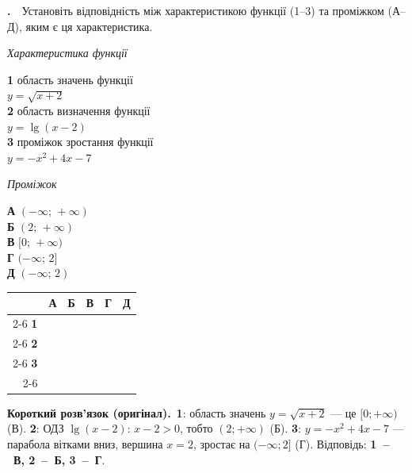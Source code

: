 \documentclass[12pt]{article}
\newcommand{\matchingGrid}{%
    \begingroup
    \renewcommand{\arraystretch}{1.15}
    \setlength{\tabcolsep}{4pt}
    \footnotesize
    \begin{tabular}{r|c|c|c|c|c|}
         \multicolumn{1}{c}{} & \multicolumn{1}{c}{\textbf{А}} & \multicolumn{1}{c}{\textbf{Б}} & \multicolumn{1}{c}{\textbf{В}} & \multicolumn{1}{c}{\textbf{Г}} & \multicolumn{1}{c}{\textbf{Д}} \\ \cline{2-6}
         \textbf{1} & \phantom{X} & \phantom{X} & \phantom{X} & \phantom{X} & \phantom{X} \\ \cline{2-6}
         \textbf{2} & & & & & \\ \cline{2-6}
         \textbf{3} & & & & & \\ \cline{2-6}
    \end{tabular}
    \endgroup
}
\newcounter{zad}
\newcommand{\zadtask}[1]{\stepcounter{zad}\noindent\textbf{\thezad.}\ \ #1\par\vspace{0.2cm}}
\newcommand{\solution}[1]{%
\par\vspace{0.12cm}
\begin{tcolorbox}[colback=titleBg!45, colframe=mainGreen!55, boxrule=0.4pt, arc=2pt,
    left=6pt, right=6pt, top=3pt, bottom=3pt, breakable]
\footnotesize\textbf{Короткий розв'язок (оригінал).}\ #1
\end{tcolorbox}
\par\vspace{0.12cm}
}
\begin{document}
\zadtask{Установіть відповідність між характеристикою функції (1--3) та проміжком (А--Д), яким є ця характеристика.

\vspace{0.2cm}
\noindent
\begin{minipage}[t]{0.45\textwidth}
\textit{Характеристика функції}\par\vspace{0.15cm}
\textbf{1} \quad область значень функції\\ $y = \sqrt{x+2}$\\[0.25cm]
\textbf{2} \quad область визначення функції \\$y = \lg(x-2)$\\[0.25cm]
\textbf{3} \quad проміжок зростання функції\\ $y = -x^2 + 4x - 7$
\end{minipage}
\hfill
\begin{minipage}[t]{0.3\textwidth}
\textit{Проміжок}\par\vspace{0.15cm}
\textbf{А} \quad $(-\infty;\, +\infty)$\\[0.15cm]
\textbf{Б} \quad $(2;\, +\infty)$\\[0.15cm]
\textbf{В} \quad $[0;\, +\infty)$\\[0.15cm]
\textbf{Г} \quad $(-\infty;\, 2]$\\[0.15cm]
\textbf{Д} \quad $(-\infty;\, 2)$
\end{minipage}
\hfill
\begin{minipage}[t]{0.2\textwidth}
\vspace{0.4cm}
\begin{flushright}\matchingGrid\end{flushright}
\end{minipage}
}
\solution{\textbf{1}: область значень $y=\sqrt{x+2}$ — це $[0;+\infty)$ (В). \textbf{2}: ОДЗ $\lg(x-2)$: $x-2>0$, тобто $(2;+\infty)$ (Б). \textbf{3}: $y=-x^2+4x-7$ — парабола вітками вниз, вершина $x=2$, зростає на $(-\infty;2]$ (Г). Відповідь: \textbf{1~--~В, 2~--~Б, 3~--~Г}.}
\end{document}
